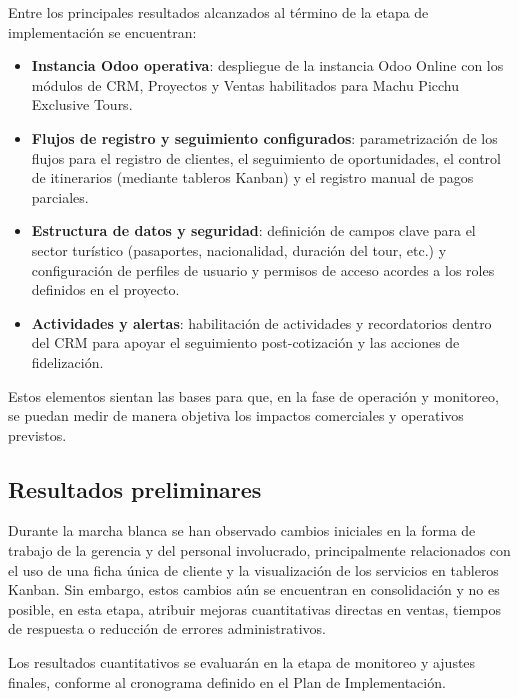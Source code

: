 \begin{indentedsubsection}
Entre los principales resultados alcanzados al término de la etapa de implementación se encuentran:

\begin{itemize}
    \item[a.] \textbf{Instancia Odoo operativa}: despliegue de la instancia Odoo Online con los módulos de CRM, Proyectos y Ventas habilitados para Machu Picchu Exclusive Tours.
    \item[b.] \textbf{Flujos de registro y seguimiento configurados}: parametrización de los flujos para el registro de clientes, el seguimiento de oportunidades, el control de itinerarios (mediante tableros Kanban) y el registro manual de pagos parciales.
    \item[c.] \textbf{Estructura de datos y seguridad}: definición de campos clave para el sector turístico (pasaportes, nacionalidad, duración del tour, etc.) y configuración de perfiles de usuario y permisos de acceso acordes a los roles definidos en el proyecto.
    \item[d.] \textbf{Actividades y alertas}: habilitación de actividades y recordatorios dentro del CRM para apoyar el seguimiento post-cotización y las acciones de fidelización.
\end{itemize}

Estos elementos sientan las bases para que, en la fase de operación y monitoreo, se puedan medir de manera objetiva los impactos comerciales y operativos previstos.

\end{indentedsubsection}

\subsection{Resultados preliminares}

\begin{indentedsubsection}
Durante la marcha blanca se han observado cambios iniciales en la forma de trabajo de la gerencia y del personal involucrado, principalmente relacionados con el uso de una ficha única de cliente y la visualización de los servicios en tableros Kanban. Sin embargo, estos cambios aún se encuentran en consolidación y no es posible, en esta etapa, atribuir mejoras cuantitativas directas en ventas, tiempos de respuesta o reducción de errores administrativos.

Los resultados cuantitativos se evaluarán en la etapa de monitoreo y ajustes finales, conforme al cronograma definido en el Plan de Implementación.

\end{indentedsubsection}

